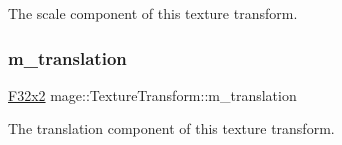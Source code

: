 The scale component of this texture transform. \hypertarget{classmage_1_1_texture_transform_a1a8adc206e6b6f7e3ec255fc82e73524}{}\label{classmage_1_1_texture_transform_a1a8adc206e6b6f7e3ec255fc82e73524} 
\subsubsection{\texorpdfstring{m\+\_\+translation}{m\_translation}}
{\footnotesize\ttfamily \hyperlink{namespacemage_aa87237ad091f5cd7da612b8523fc108f}{F32x2} mage\+::\+Texture\+Transform\+::m\+\_\+translation\hspace{0.3cm}{\ttfamily [private]}}

The translation component of this texture transform. 